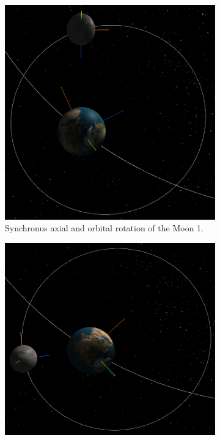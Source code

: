\documentclass[12pt]{article}
\begin{document}
 \begin{figure}[H]
        \centering
        \begin{subfigure}[b]{0.38\textwidth}
                \includegraphics[width=\textwidth]{images/syncrotation1}
                \caption{Synchronus axial and orbital rotation of the Moon 1.}
                \label{fig: Synchronus axial and orbital rotation of the Moon.}
	 \end{subfigure}
        \begin{subfigure}[b]{0.38\textwidth}
                \includegraphics[width=\textwidth]{images/syncrotation2}

\end{subfigure}
\end{figure}
\end{document}
